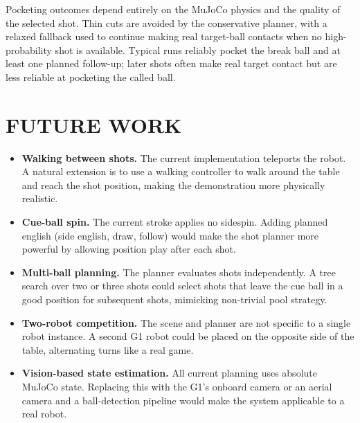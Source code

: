 \documentclass[letterpaper, 12 pt, conference]{ieeeconf}
\begin{document}
Pocketing outcomes depend entirely on the MuJoCo physics and the quality of the
selected shot. Thin cuts are avoided by the conservative planner, with a relaxed
fallback used to continue making real target-ball contacts when no high-probability
shot is available. Typical runs reliably pocket the break ball and at least one
planned follow-up; later shots often make real target contact but are less
reliable at pocketing the called ball.

\section{FUTURE WORK}

\begin{itemize}
  \item \textbf{Walking between shots.} The current implementation teleports
    the robot. A natural extension is to use a walking controller to walk around the table and reach the shot
    position, making the demonstration more physically realistic.

  \item \textbf{Cue-ball spin.} The current stroke applies no sidespin. Adding
    planned english (side english, draw, follow) would make the shot planner
    more powerful by allowing position play after each shot.

  \item \textbf{Multi-ball planning.} The planner evaluates shots independently.
    A tree search over two or three shots could select shots that leave the
    cue ball in a good position for subsequent shots, mimicking non-trivial pool
    strategy.

  \item \textbf{Two-robot competition.} The scene and planner are not specific
    to a single robot instance. A second G1 robot could be placed on the
    opposite side of the table, alternating turns like a real game.

  \item \textbf{Vision-based state estimation.} All current planning uses
    absolute MuJoCo state. Replacing this with the G1's onboard camera or an aerial camera and a
    ball-detection pipeline would make the system applicable to a real robot.
\end{itemize}
\end{document}

